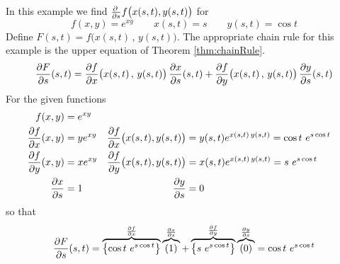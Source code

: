 \begin{eg}\label{eg:chainRuleAA}
In this example we find $\pdiff{}{s}f\big(x(s,t),y(s,t)\big)$ for 
\begin{equation*}
f(x,y)=e^{xy}\qquad x(s,t)=s \qquad y(s,t)=\cos t
\end{equation*}
Define $F(s,t)=f\big(x(s,t)\,,\,y(s,t)\big)$. The appropriate chain rule for this 
example is the upper equation of Theorem \ref{thm:chainRule}.
\begin{equation*}
\pdiff{F}{s}(s,t)
=  \pdiff{f}{x}\big(x(s,t)\,,\,y(s,t)\big)\, \pdiff{x}{s}(s,t)
   +\pdiff{f}{y}\big(x(s,t)\,,\,y(s,t)\big)\, \pdiff{y}{s}(s,t)
\end{equation*}
For the given functions
\begin{align*}
f(x,y)&=e^{xy}  \\
\pdiff{f}{x}(x,y)&= ye^{xy}  &
\pdiff{f}{x}\big(x(s,t),y(s,t)\big)&= y(s,t) e^{x(s,t)\,y(s,t)}
                                    = \cos t\ e^{s\cos t} \\
\pdiff{f}{y}(x,y)&= xe^{xy}  &
\pdiff{f}{y}\big(x(s,t),y(s,t)\big)&= x(s,t) e^{x(s,t)\,y(s,t)}
                                    = s\ e^{s\cos t} \\
\pdiff{x}{s}&=1 &
\pdiff{y}{s}&=0  
\end{align*}
so that 
$$
\pdiff{F}{s}(s,t)=\overbrace{\left\{\cos t\ e^{s\cos t}\right\}}^{\pdiff{f}{x}}
                  \overbrace{(1) }^{\pdiff{x}{s}}
                  +\overbrace{\left\{s\ e^{s\cos t}\right\}}^{\pdiff{f}{y}}
                    \overbrace{(0) }^{\pdiff{y}{s}}
                 = \cos t\ e^{s\cos t}
$$

\end{eg}

